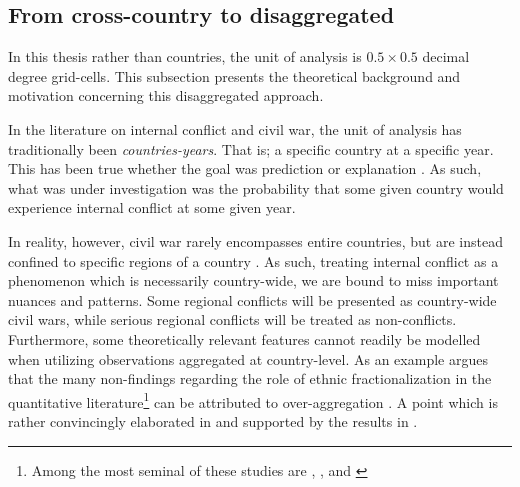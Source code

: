 \documentclass[a4paper]{article}
\begin{document}



\subsection{From cross-country to disaggregated} %

In this thesis rather than countries, the unit of analysis is $0.5\times0.5$ decimal degree grid-cells. This subsection presents the theoretical background and motivation concerning this disaggregated approach.\par

In the literature on internal conflict and civil war, the unit of analysis has traditionally been \emph{countries-years}. That is; a specific country at a specific year. This has been true whether the goal was prediction \citep{Goldstone_2010, mueller_2016} or explanation \citep{Collier_Hoeffler_1998, Fearon_Laitin_2003, Collier_Hoeffler_2004, Hegre_Sambanis_2006}. As such, what was under investigation was the probability that some given country would experience internal conflict at some given year.\par

In reality, however, civil war rarely encompasses entire countries, but are instead confined to specific regions of a country \cite[487]{Cederman_Gleditsch_2009}. As such, treating internal conflict as a phenomenon which is necessarily country-wide, we are bound to miss important nuances and patterns. Some regional conflicts will be presented as country-wide civil wars, while serious regional conflicts will be treated as non-conflicts. Furthermore, some theoretically relevant features cannot readily be modelled when utilizing observations aggregated at country-level. As an example \cite{Cederman_Gleditsch_2009} argues that the many non-findings regarding the role of ethnic fractionalization in the quantitative literature\footnote{Among the most seminal of these studies are \cite{Fearon_Laitin_2003}, \cite{Collier_Hoeffler_2004}, and \cite{Hegre_Sambanis_2006}} can be attributed to over-aggregation \citep[493]{Cederman_Gleditsch_2009}. A point which is rather convincingly elaborated in \cite{Cederman_Gleditsch_Buhaug_2013} and supported by the results in \cite{Goldstone_2010}. 
\end{document}
